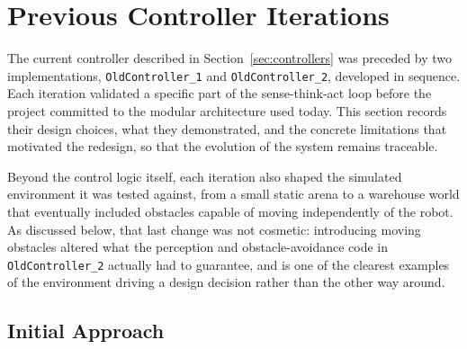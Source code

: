 \section{Previous Controller Iterations}
\label{sec:old-controller}

The current controller described in Section~\ref{sec:controllers} was preceded by two implementations, \texttt{OldController\_1} and \texttt{OldController\_2}, developed in sequence. Each iteration validated a specific part of the sense-think-act loop before the project committed to the modular architecture used today. This section records their design choices, what they demonstrated, and the concrete limitations that motivated the redesign, so that the evolution of the system remains traceable.

Beyond the control logic itself, each iteration also shaped the simulated environment it was tested against, from a small static arena to a warehouse world that eventually included obstacles capable of moving independently of the robot. As discussed below, that last change was not cosmetic: introducing moving obstacles altered what the perception and obstacle-avoidance code in \texttt{OldController\_2} actually had to guarantee, and is one of the clearest examples of the environment driving a design decision rather than the other way around.

\subsection{Initial Approach}
\label{subsec:old-controller-initial}

